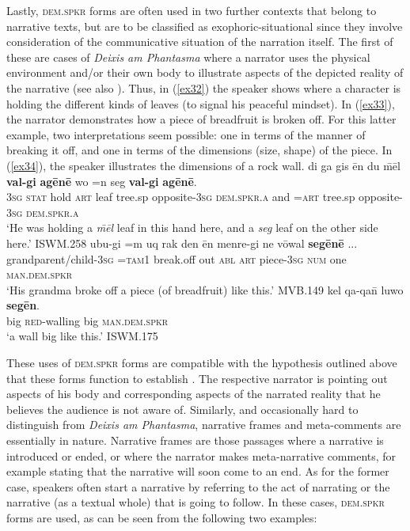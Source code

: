 \documentclass[output=paper
,modfonts
,nonflat]{langsci/langscibook}
\begin{document}
Lastly, \textsc{dem.spkr} forms are often used in two further contexts that belong to narrative texts, but are to be classified as exophoric-situational since they involve consideration of the communicative situation of the narration itself. The first of these are cases of \textit{Deixis am Phantasma} \citep{Buehler1934} where a narrator uses the physical environment and/or their own body to illustrate aspects of the depicted reality of the narrative (see also \citealt[224]{Himmelmann1996}). Thus, in (\ref{ex32}) the speaker shows where a character is holding the different kinds of leaves (to signal his peaceful mindset). In (\ref{ex33}), the narrator demonstrates how a piece of breadfruit is broken off. For this latter example, two interpretations seem possible: one in terms of the manner of breaking it off, and one in terms of the dimensions (size, shape) of the piece. In (\ref{ex34}), the speaker illustrates the dimensions of a rock wall.
\ea	\label{ex32}
\gll 	di 		ga		gis	\=en		du		\=m\=el		\textbf{val-gi}			\textbf{ag\=en\=e} 	wo	=n	seg		\textbf{val-gi}			\textbf{ag\=en\=e}.	\\
		\textsc{3sg}	\textsc{stat}	hold	\textsc{art}	leaf	tree.sp		opposite-\textsc{3sg}	\textsc{dem.spkr.a}	and	\textsc{=art}	tree.sp		opposite-\textsc{3sg}	\textsc{dem.spkr.a}	\\
\glt	`He was holding a \textit{\=m\=el} leaf in this hand here, and a \textit{seg} leaf on the other side here.'	\hfill{ISWM.258}
\z
\ea	\label{ex33}
\gll 	{\textquotesingle}ubu-gi						=m		{\textquotesingle}uq			rak	den 			\=en 	menre-gi	ne		v\=owal	\textbf{seg\=en\=e} 		{\ob}...{\cb}	\\
		grandparent/child-\textsc{3sg}	\textsc{=tam1}	break.off		out	\textsc{abl}	\textsc{art}	piece-\textsc{3sg}	\textsc{num}		one		\textsc{man.dem.spkr}	\\
\glt	`His grandma broke off a piece (of breadfruit) like this.'	\hfill{MVB.149}
\z
\ea	\label{ex34}
\gll 	kel 	qa-qa\=n 		luwo \textbf{seg\=en}.			\\
		big		\textsc{red}-walling	big	\textsc{man.dem.spkr} \\
\glt	`a wall big like this.'		\hfill{ISWM.175}
\z

\noindent
These uses of \textsc{dem.spkr} forms are compatible with the hypothesis outlined above that these forms function to establish . The respective narrator is pointing out aspects of his body and corresponding aspects of the narrated reality that he believes the audience is not aware of. Similarly, and occasionally hard to distinguish from \textit{Deixis am Phantasma}, narrative frames and meta-comments are essentially  in nature. Narrative frames are those passages where a narrative is introduced or ended, or where the narrator makes meta-narrative comments, for example stating that the narrative will soon come to an end. As for the former case, speakers often start a narrative by referring to the act of narrating or the narrative (as a textual whole) that is going to follow. In these cases, \textsc{dem.spkr} forms are used, as can be seen from the following two examples:
\end{document}
